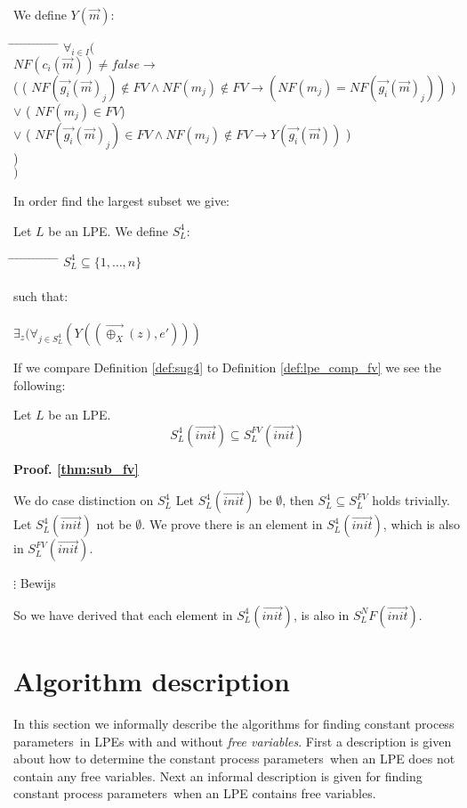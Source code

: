 \index{}\documentclass[a4paper,10pt]{article}
\theoremstyle{plain}
\theoremstyle{definition}
\newcommand{\ovr}{\overrightarrow}
\newcommand{\pps}{process parameters}
\newcommand{\ti}{\textit}
\newcommand{\tb}{\textbf}
\newcommand{\tab}{\hspace*{5.mm} \= \hspace*{5.mm} \= \hspace*{5.mm} \= \hspace*{5.mm} \= \hspace*{5.mm} \= \hspace*{5.mm}  \= \hspace*{5.mm}  \= \hspace*{5.mm}  \= \hspace*{5.mm} \= \hspace*{5.mm} \= \hspace*{5.mm}  \= \hspace*{5.mm}  \= \hspace*{5.mm}\kill}
\begin{document}
\begin{defn} We define $Y(\ovr{m})$:
\begin{tabbing}
\tab
$\forall_{i \in I}($\\
\> $NF(c_i(\ovr{m})) \neq false \rightarrow$ \\
\> ( \> 		\> ( $NF(\ovr{g_i}(\ovr{m})_j) \not\in FV \wedge NF(m_j) \not\in FV \rightarrow (NF(m_j) = NF(\ovr{g_i}(\ovr{m})_j))$ )\\
\> \> $\vee$ 	\> ( $NF( m_j) \in FV $)\\
\> \> $\vee$ 	\>	( $NF(\ovr{g_i}(\ovr{m})_j) \in FV \wedge NF(m_j) \not\in FV \rightarrow Y(\ovr{g_i}(\ovr{m}))$ )\\
\> ) \\
$)$
\end{tabbing}
\end{defn}

\noindent In order find the largest subset we give: %
\begin{defn} \label{def:sug4} Let $L$ be an LPE. We define $S_L^4$:
\begin{tabbing}
\tab
$ S_L^4 \subseteq \lbrace 1, \ldots, n \rbrace $ \\ \\
such that:\\ \\
$\exists_{z}( \forall_{j \in S_L^4} (Y((\ovr{\oplus_X}(z), e')))$ \\
\end{tabbing}
\end{defn}
If we compare Definition \ref{def:sug4} to Definition \ref{def:lpe_comp_fv} we see the following:
\begin{thm} Let $L$ be an LPE. \label{thm:sub_fv}
$$S_L^4(\ovr{init}) \subseteq S_L^{FV}(\ovr{init}) $$
\end{thm} 
\begin{flushleft}
\tb{Proof. \ref{thm:sub_fv}}
\end{flushleft}
We do case distinction on $S_L^4$
Let $S_L^4(\ovr{init})$ be $\emptyset$, then $S_L^4 \subseteq S_L^{FV}$ holds trivially.
Let $S_L^4(\ovr{init})$ not be $\emptyset$. We prove there is an element in $S_L^4(\ovr{init})$, which is also in $S_L^{FV}(\ovr{init})$.
\begin{tabbing}
$\vdots$ Bewijs
\end{tabbing}

So we have derived that each element in $S_L^4(\ovr{init})$, is also in $S_L^NF(\ovr{init})$.


\section{Algorithm description}
In this section we informally describe the algorithms for finding constant \pps\ in LPEs with and without \ti{free variables}. First a description is given about how to determine the constant \pps\ when an LPE does not contain any free variables. Next an informal description is given for finding constant \pps\ when an LPE contains free variables.
\end{document}
